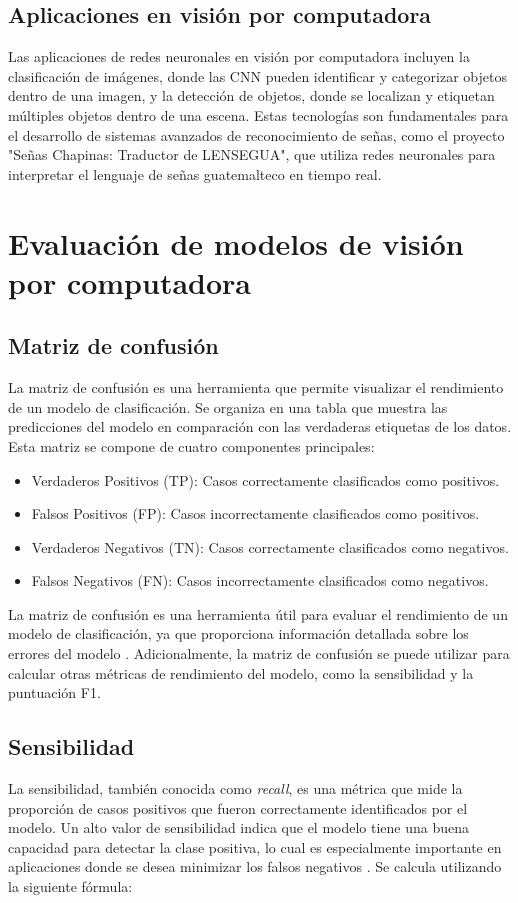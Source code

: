 \subsection{Aplicaciones en visión por computadora}
Las aplicaciones de redes neuronales en visión por computadora incluyen la clasificación de imágenes, donde las CNN pueden identificar y categorizar objetos dentro de una imagen, y la detección de objetos, donde se localizan y etiquetan múltiples objetos dentro de una escena.
Estas tecnologías son fundamentales para el desarrollo de sistemas avanzados de reconocimiento de señas, como el proyecto "Señas Chapinas: Traductor de LENSEGUA", que utiliza redes neuronales para interpretar el lenguaje de señas guatemalteco en tiempo real.

\section{Evaluación de modelos de visión por computadora}

\subsection{Matriz de confusión}
La matriz de confusión es una herramienta que permite visualizar el rendimiento de un modelo de clasificación. 
Se organiza en una tabla que muestra las predicciones del modelo en comparación con las verdaderas etiquetas de los datos. 
Esta matriz se compone de cuatro componentes principales:
\begin{itemize}
    \item Verdaderos Positivos (TP): Casos correctamente clasificados como positivos.
    \item Falsos Positivos (FP): Casos incorrectamente clasificados como positivos.
    \item Verdaderos Negativos (TN): Casos correctamente clasificados como negativos.
    \item Falsos Negativos (FN): Casos incorrectamente clasificados como negativos.
\end{itemize}

La matriz de confusión es una herramienta útil para evaluar el rendimiento de un modelo de clasificación, ya que proporciona información detallada sobre los errores del modelo \cite{ibm2024MC}.
Adicionalmente, la matriz de confusión se puede utilizar para calcular otras métricas de rendimiento del modelo, como la sensibilidad y la puntuación F1.

\subsection{Sensibilidad}
La sensibilidad, también conocida como \textit{recall}, es una métrica que mide la proporción de casos positivos que fueron correctamente identificados por el modelo.
Un alto valor de sensibilidad indica que el modelo tiene una buena capacidad para detectar la clase positiva, lo cual es especialmente importante en aplicaciones donde se desea minimizar los falsos negativos \cite{ML2024Recall}.
Se calcula utilizando la siguiente fórmula:

